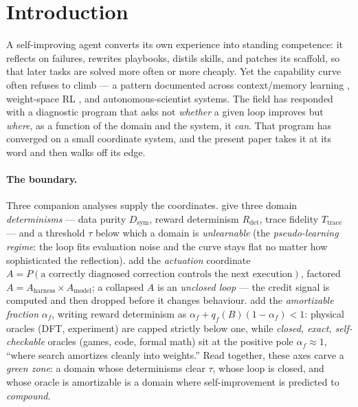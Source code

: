 \documentclass[11pt]{article}
\newcommand{\Dsym}{D_{\mathrm{sym}}}
\newcommand{\Rdet}{R_{\mathrm{det}}}
\newcommand{\Ttrace}{T_{\mathrm{trace}}}
\newcommand{\af}{\alpha_f}
\begin{document}
\section{Introduction}
A self-improving agent converts its own experience into standing competence: it reflects on failures,
rewrites playbooks, distils skills, and patches its scaffold, so that later tasks are solved more often
or more cheaply. Yet the capability curve often refuses to climb --- a pattern documented across
context/memory learning \citep{zhang2025ace}, weight-space RL \citep{yue2025rlvr,wu2025leash}, and
autonomous-scientist systems. The field has responded with a diagnostic program that asks not
\emph{whether} a given loop improves but \emph{where}, as a function of the domain and the system, it
\emph{can}. That program has converged on a small coordinate system, and the present paper takes it at
its word and then walks off its edge.

\paragraph{The boundary.} Three companion analyses supply the coordinates.
\citet{determinismmanifold} give three domain \emph{determinisms} --- data purity $\Dsym$, reward
determinism $\Rdet$, trace fidelity $\Ttrace$ --- and a threshold $\tau$ below which a domain is
\emph{unlearnable} (the \emph{pseudo-learning regime}: the loop fits evaluation noise and the curve
stays flat no matter how sophisticated the reflection). \citet{actuation} add the \emph{actuation}
coordinate $A=P(\text{a correctly diagnosed correction controls the next execution})$, factored
$A=A_{\mathrm{harness}}\times A_{\mathrm{model}}$; a collapsed $A$ is an \emph{unclosed loop} --- the
credit signal is computed and then dropped before it changes behaviour. \citet{oracleresidue} add the
\emph{amortizable fraction} $\af$, writing reward determinism as $\af+q_f(B)(1-\af)<1$: physical oracles
(DFT, experiment) are capped strictly below one, while \emph{closed, exact, self-checkable} oracles
(games, code, formal math) sit at the positive pole $\af\!\approx\!1$, ``where search amortizes cleanly
into weights.'' Read together, these axes carve a \emph{green zone}: a domain whose determinisms clear
$\tau$, whose loop is closed, and whose oracle is amortizable is a domain where self-improvement is
predicted to \emph{compound}.
\end{document}

